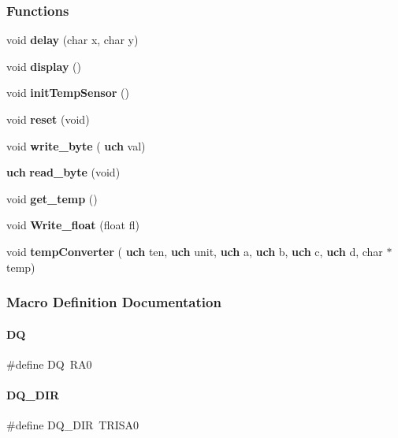 \subsubsection*{Functions}
\begin{DoxyCompactItemize}
\item 
void \textbf{ delay} (char x, char y)
\item 
void \textbf{ display} ()
\item 
void \textbf{ init\+Temp\+Sensor} ()
\item 
void \textbf{ reset} (void)
\item 
void \textbf{ write\+\_\+byte} (\textbf{ uch} val)
\item 
\textbf{ uch} \textbf{ read\+\_\+byte} (void)
\item 
void \textbf{ get\+\_\+temp} ()
\item 
void \textbf{ Write\+\_\+float} (float fl)
\item 
void \textbf{ temp\+Converter} (\textbf{ uch} ten, \textbf{ uch} unit, \textbf{ uch} a, \textbf{ uch} b, \textbf{ uch} c, \textbf{ uch} d, char $\ast$temp)
\end{DoxyCompactItemize}


\subsubsection{Macro Definition Documentation}
\mbox{\label{a00050_a8c6d20fa75890dde1095dee1df08dc18}} 
\paragraph{DQ}
{\footnotesize\ttfamily \#define DQ~R\+A0}

\mbox{\label{a00050_a4bedd6c24dd98ebf48ef581a9cb64f11}} 
\paragraph{D\+Q\+\_\+\+D\+IR}
{\footnotesize\ttfamily \#define D\+Q\+\_\+\+D\+IR~T\+R\+I\+S\+A0}

\mbox{\label{a00050_ac9afda724e27de599f329e5d2eb53497}} 
